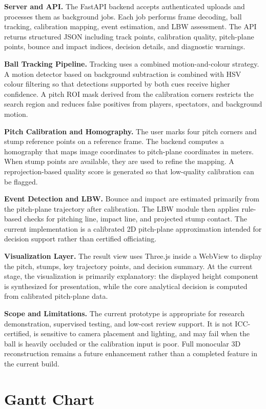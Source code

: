 \documentclass[12pt,a4paper]{article}
\begin{document}
\textbf{Server and API.} The FastAPI backend accepts authenticated uploads and processes them as background jobs. Each job performs frame decoding, ball tracking, calibration mapping, event estimation, and LBW assessment. The API returns structured JSON including track points, calibration quality, pitch-plane points, bounce and impact indices, decision details, and diagnostic warnings.

\textbf{Ball Tracking Pipeline.} Tracking uses a combined motion-and-colour strategy. A motion detector based on background subtraction is combined with HSV colour filtering so that detections supported by both cues receive higher confidence. A pitch ROI mask derived from the calibration corners restricts the search region and reduces false positives from players, spectators, and background motion.

\textbf{Pitch Calibration and Homography.} The user marks four pitch corners and stump reference points on a reference frame. The backend computes a homography that maps image coordinates to pitch-plane coordinates in meters. When stump points are available, they are used to refine the mapping. A reprojection-based quality score is generated so that low-quality calibration can be flagged.

\textbf{Event Detection and LBW.} Bounce and impact are estimated primarily from the pitch-plane trajectory after calibration. The LBW module then applies rule-based checks for pitching line, impact line, and projected stump contact. The current implementation is a calibrated 2D pitch-plane approximation intended for decision support rather than certified officiating.

\textbf{Visualization Layer.} The result view uses Three.js inside a WebView to display the pitch, stumps, key trajectory points, and decision summary. At the current stage, the visualization is primarily explanatory: the displayed height component is synthesized for presentation, while the core analytical decision is computed from calibrated pitch-plane data.

\textbf{Scope and Limitations.} The current prototype is appropriate for research demonstration, supervised testing, and low-cost review support. It is not ICC-certified, is sensitive to camera placement and lighting, and may fail when the ball is heavily occluded or the calibration input is poor. Full monocular 3D reconstruction remains a future enhancement rather than a completed feature in the current build.

\section{Gantt Chart}
\end{document}
